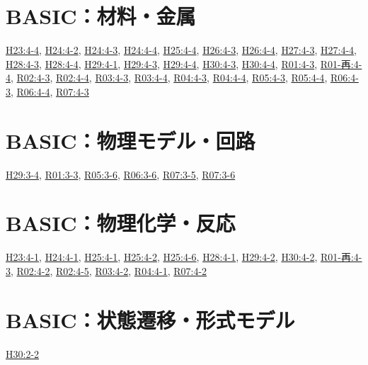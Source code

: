 \section{BASIC：材料・金属}
\hyperref[q:h23-reg-basic-4-4]{H23:4-4}, \hyperref[q:h24-reg-basic-4-2]{H24:4-2}, \hyperref[q:h24-reg-basic-4-3]{H24:4-3}, \hyperref[q:h24-reg-basic-4-4]{H24:4-4}, \hyperref[q:h25-reg-basic-4-4]{H25:4-4}, \hyperref[q:h26-reg-basic-4-3]{H26:4-3}, \hyperref[q:h26-reg-basic-4-4]{H26:4-4}, \hyperref[q:h27-reg-basic-4-3]{H27:4-3}, \hyperref[q:h27-reg-basic-4-4]{H27:4-4}, \hyperref[q:h28-reg-basic-4-3]{H28:4-3}, \hyperref[q:h28-reg-basic-4-4]{H28:4-4}, \hyperref[q:h29-reg-basic-4-1]{H29:4-1}, \hyperref[q:h29-reg-basic-4-3]{H29:4-3}, \hyperref[q:h29-reg-basic-4-4]{H29:4-4}, \hyperref[q:h30-reg-basic-4-3]{H30:4-3}, \hyperref[q:h30-reg-basic-4-4]{H30:4-4}, \hyperref[q:r01-reg-basic-4-3]{R01:4-3}, \hyperref[q:r01-ret-basic-4-4]{R01-再:4-4}, \hyperref[q:r02-reg-basic-4-3]{R02:4-3}, \hyperref[q:r02-reg-basic-4-4]{R02:4-4}, \hyperref[q:r03-reg-basic-4-3]{R03:4-3}, \hyperref[q:r03-reg-basic-4-4]{R03:4-4}, \hyperref[q:r04-reg-basic-4-3]{R04:4-3}, \hyperref[q:r04-reg-basic-4-4]{R04:4-4}, \hyperref[q:r05-reg-basic-4-3]{R05:4-3}, \hyperref[q:r05-reg-basic-4-4]{R05:4-4}, \hyperref[q:r06-reg-basic-4-3]{R06:4-3}, \hyperref[q:r06-reg-basic-4-4]{R06:4-4}, \hyperref[q:r07-reg-basic-4-3]{R07:4-3}
\section{BASIC：物理モデル・回路}
\hyperref[q:h29-reg-basic-3-4]{H29:3-4}, \hyperref[q:r01-reg-basic-3-3]{R01:3-3}, \hyperref[q:r05-reg-basic-3-6]{R05:3-6}, \hyperref[q:r06-reg-basic-3-6]{R06:3-6}, \hyperref[q:r07-reg-basic-3-5]{R07:3-5}, \hyperref[q:r07-reg-basic-3-6]{R07:3-6}
\section{BASIC：物理化学・反応}
\hyperref[q:h23-reg-basic-4-1]{H23:4-1}, \hyperref[q:h24-reg-basic-4-1]{H24:4-1}, \hyperref[q:h25-reg-basic-4-1]{H25:4-1}, \hyperref[q:h25-reg-basic-4-2]{H25:4-2}, \hyperref[q:h25-reg-basic-4-6]{H25:4-6}, \hyperref[q:h28-reg-basic-4-1]{H28:4-1}, \hyperref[q:h29-reg-basic-4-2]{H29:4-2}, \hyperref[q:h30-reg-basic-4-2]{H30:4-2}, \hyperref[q:r01-ret-basic-4-3]{R01-再:4-3}, \hyperref[q:r02-reg-basic-4-2]{R02:4-2}, \hyperref[q:r02-reg-basic-4-5]{R02:4-5}, \hyperref[q:r03-reg-basic-4-2]{R03:4-2}, \hyperref[q:r04-reg-basic-4-1]{R04:4-1}, \hyperref[q:r07-reg-basic-4-2]{R07:4-2}
\section{BASIC：状態遷移・形式モデル}
\hyperref[q:h30-reg-basic-2-2]{H30:2-2}
